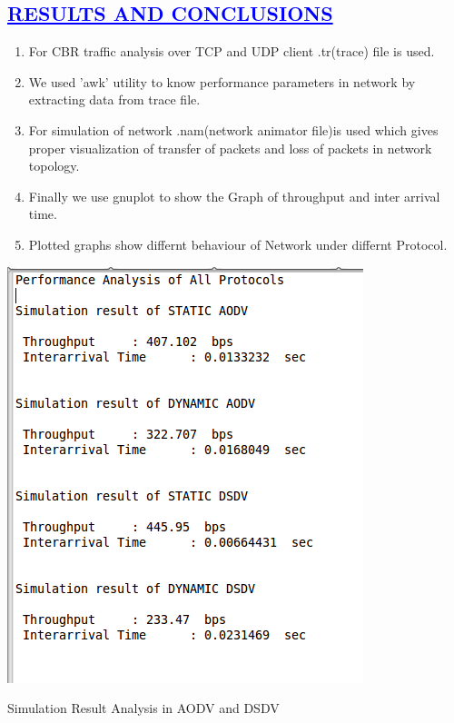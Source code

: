 \documentclass[a4paper,12pt]{report}
\begin{document}
\begin{center}
\chapter{\textcolor{blue}{\underline {RESULTS AND CONCLUSIONS}}}
\begin{enumerate}
\item For CBR traffic analysis over TCP and UDP client .tr(trace) file is used.
\item We used 'awk' utility to know performance parameters in network by extracting data from trace file.
\item For simulation of network .nam(network animator file)is used which gives proper visualization of transfer of packets and loss of packets in network topology. 
\item Finally we use gnuplot to show the Graph of throughput and inter arrival time.
\item  Plotted graphs show  differnt  behaviour of Network under differnt Protocol.


\end{enumerate}
\end{center}
\begin{center}

 \includegraphics[width=15 cm,height=13 cm]{./results.png}

Simulation Result  Analysis in AODV and DSDV
\end{center}
\end{document}
